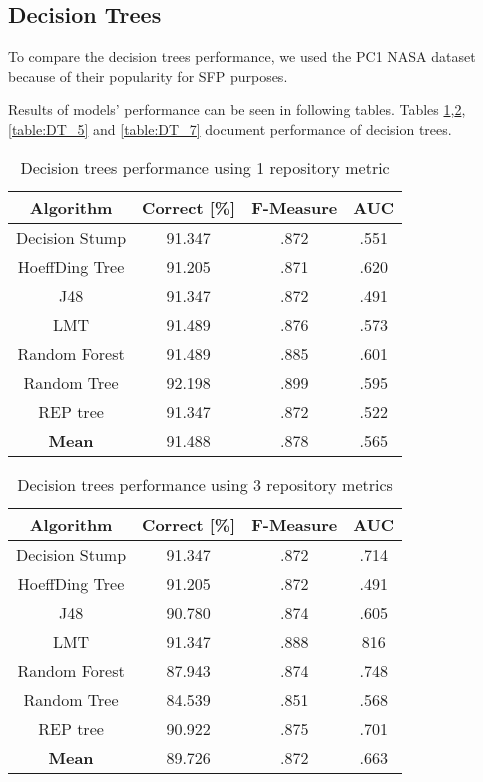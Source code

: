 \subsection{Decision Trees}
To compare the decision trees performance, we used the PC1 NASA dataset because of their popularity for SFP purposes.

Results of models' performance can be seen in following tables. Tables \ref{table:DT_1},\ref{table:DT_3}, \ref{table:DT_5} and \ref{table:DT_7} document performance of decision trees.


\begin{table}[h!]
\centering
\begin{tabular}{ |c|c|c|c| }
 \hline
 \textbf{Algorithm} & \textbf{Correct [\%]} & \textbf{F-Measure} & \textbf{AUC}  \\
 \hline
 Decision Stump & 91.347 & .872 & .551    \\
 \hline
 HoeffDing Tree &  91.205 & .871 & .620   \\
 \hline
  J48 & 91.347 & .872 & .491\\
 \hline
  LMT & 91.489 & .876 & .573  \\
 \hline
  Random Forest & 91.489 & .885 & .601 \\
 \hline
  Random Tree & 92.198 & .899 & .595 \\
 \hline
 REP tree  & 91.347 & .872 & .522 \\
 \hline
 \textbf{Mean}  & 91.488 & .878 & .565 \\
 \hline

\end{tabular}
\caption{Decision trees performance using 1 repository metric}
\label{table:DT_1}
\end{table}

\begin{table}[h!]
\centering
\begin{tabular}{ |c|c|c|c| }
 \hline
 \textbf{Algorithm} & \textbf{Correct [\%]} & \textbf{F-Measure} & \textbf{AUC}  \\
 \hline
 Decision Stump & 91.347 & .872 & .714    \\
 \hline
 HoeffDing Tree &  91.205 & .872 & .491   \\
 \hline
  J48 & 90.780 & .874 & .605\\
 \hline
  LMT & 91.347 & .888 & 816  \\
 \hline
  Random Forest & 87.943 & .874 & .748 \\
 \hline
  Random Tree & 84.539 & .851 & .568 \\
 \hline
 REP tree  & 90.922 & .875 & .701 \\
 \hline
 \textbf{Mean}  & 89.726 & .872 & .663 \\
 \hline

\end{tabular}
\caption{Decision trees performance using 3 repository metrics}
\label{table:DT_3}
\end{table}

